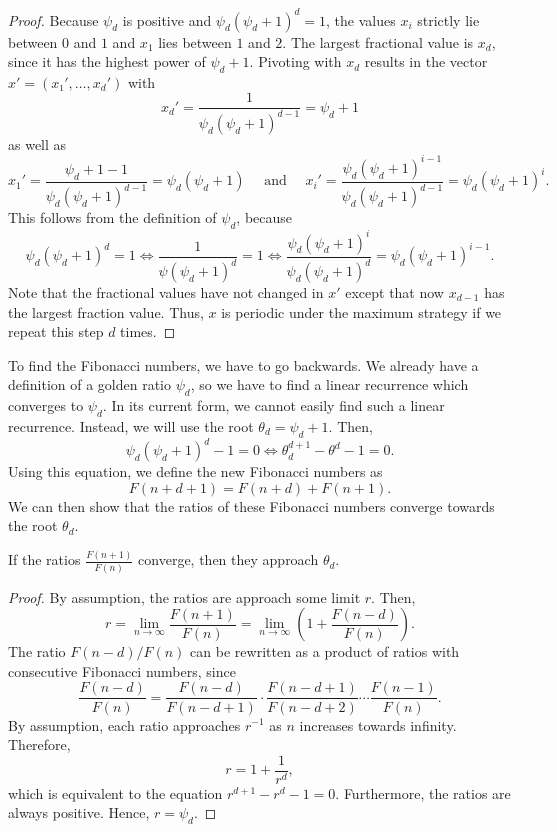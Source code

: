 \begin{proof}
  Because $ψ_d$ is positive and $ψ_d (ψ_d + 1)^d = 1$,
  the values $x_i$ strictly lie between $0$ and $1$
  and $x_1$ lies between $1$ and $2$.
  The largest fractional value is $x_d$,
  since it has the highest power of $ψ_d + 1$.
  Pivoting with $x_d$ results in the vector $x' = (x₁', …, x_d')$ with
  \[
    x_d' = \frac{1}{ψ_d (ψ_d + 1)^{d-1}} = ψ_d + 1
  \]
  as well as
  \[
    x_1' = \frac{ψ_d + 1 - 1}{ψ_d (ψ_d + 1)^{d-1}} = ψ_d (ψ_d + 1)
    \quad
    \text{ and }
    \quad
    x_i' = \frac{ψ_d (ψ_d + 1)^{i-1}}{ψ_d (ψ_d + 1)^{d-1}} = ψ_d (ψ_d + 1)^i.
  \]
  This follows from the definition of $ψ_d$, because
  \[
    ψ_d(ψ_d + 1)^d = 1 \iff \frac{1}{ψ(ψ_d + 1)^d} = 1 \iff \frac{ψ_d (ψ_d + 1)^i}{ψ_d (ψ_d + 1)^d} = ψ_d (ψ_d + 1)^{i-1}.
  \]
  Note that the fractional values have not changed in $x'$
  except that now $x_{d-1}$ has the largest fraction value.
  Thus, $x$ is periodic under the maximum strategy
  if we repeat this step $d$ times.
\end{proof}

To find the Fibonacci numbers, we have to go backwards.
We already have a definition of a golden ratio $ψ_d$,
so we have to find a linear recurrence which converges to $ψ_d$.
In its current form, we cannot easily find such a linear recurrence.
Instead, we will use the root $θ_d = ψ_d + 1$.
Then,
\[
  ψ_d (ψ_d + 1)^d - 1 = 0
  \iff
  θ_d^{d+1} - θ^d - 1 = 0.
\]
Using this equation, we define the new Fibonacci numbers as
\[
  F(n + d + 1) = F(n + d) + F(n + 1).
\]
We can then show that the ratios of these Fibonacci numbers converge towards the root $θ_d$.

\begin{theorem}
  If the ratios $\frac{F(n+1)}{F(n)}$ converge, then they approach $θ_d$.
\end{theorem}

\begin{proof}
  By assumption, the ratios are approach some limit $r$.
  Then,
  \[
    r
    = \lim_{n → ∞} \frac{F(n+1)}{F(n)}
    = \lim_{n → ∞} \left(1 + \frac{F(n-d)}{F(n)}\right).
  \]
  The ratio $F(n-d)/F(n)$ can be rewritten as a product of ratios with
  consecutive Fibonacci numbers, since
  \[
    \frac{F(n - d)}{F(n)}
    = \frac{F(n - d)}{F(n - d + 1)} · \frac{F(n - d + 1)}{F(n - d + 2)} ⋯ \frac{F(n - 1)}{F(n)}.
  \]
  By assumption, each ratio approaches $r^{-1}$ as $n$ increases towards infinity.
  Therefore,
  \[
    r = 1 + \frac{1}{r^d},
  \]
  which is equivalent to the equation $r^{d+1} - r^d - 1 = 0$.
  Furthermore, the ratios are always positive.
  Hence, $r = ψ_d$.
\end{proof}

